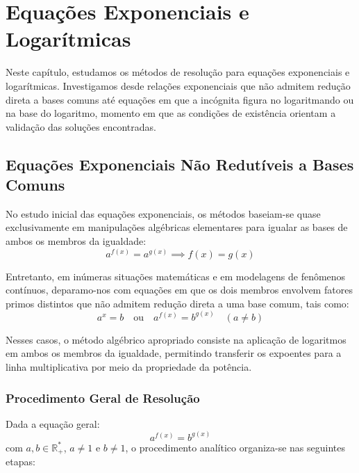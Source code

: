 \documentclass[12pt,a4paper]{report}
\begin{document}
	\chapter{Equações Exponenciais e Logarítmicas}
	\label{chap:equacoes_inequacoes}
	
	Neste capítulo, estudamos os métodos de resolução para equações exponenciais e logarítmicas. Investigamos desde relações exponenciais que não admitem redução direta a bases comuns até equações em que a incógnita figura no logaritmando ou na base do logaritmo, momento em que as condições de existência orientam a validação das soluções encontradas.
	
	\section{Equações Exponenciais Não Redutíveis a Bases Comuns}
	
	No estudo inicial das equações exponenciais, os métodos baseiam-se quase exclusivamente em manipulações algébricas elementares para igualar as bases de ambos os membros da igualdade:
	$$a^{f(x)} = a^{g(x)} \implies f(x) = g(x)$$
	
	Entretanto, em inúmeras situações matemáticas e em modelagens de fenômenos contínuos, deparamo-nos com equações em que os dois membros envolvem fatores primos distintos que não admitem redução direta a uma base comum, tais como:
	$$a^x = b \quad \text{ou} \quad a^{f(x)} = b^{g(x)} \quad (a \neq b)$$
	
	Nesses casos, o método algébrico apropriado consiste na aplicação de logaritmos em ambos os membros da igualdade, permitindo transferir os expoentes para a linha multiplicativa por meio da propriedade da potência.
	
	\subsection{Procedimento Geral de Resolução}
	
	Dada a equação geral:
	$$a^{f(x)} = b^{g(x)}$$
	com $a, b \in \mathbb{R}^*_+$, $a \neq 1$ e $b \neq 1$, o procedimento analítico organiza-se nas seguintes etapas:
	
\end{document}
